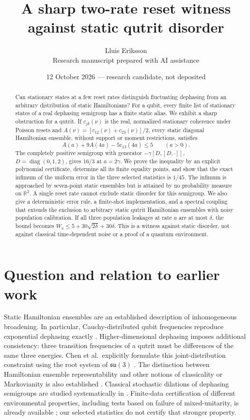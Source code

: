 \documentclass[11pt,a4paper]{article}
\title{A sharp two-rate reset witness against static qutrit disorder}
\author{Lluis Eriksson\\\small Research manuscript prepared with AI assistance}
\date{12 October 2026 --- research candidate, not deposited}
\newcommand{\R}{\mathbb R}
\newcommand{\diag}{\operatorname{diag}}
\begin{document}
\maketitle
\begin{abstract}
Can stationary states at a few reset rates distinguish fluctuating
dephasing from an arbitrary distribution of static Hamiltonians?
For a qubit, every finite list of stationary states of a real dephasing
semigroup has a finite static alias. We exhibit a sharp obstruction for
a qutrit. If $c_{jk}(\nu)$ is the real, normalized stationary coherence
under Poisson resets and $A(\nu)=[c_{12}(\nu)+c_{23}(\nu)]/2$, every
static diagonal Hamiltonian ensemble, without support or moment
restrictions, satisfies
\[
 A(a)+9A(4a)-5c_{13}(4a)\leq5\qquad(a>0).
\]
The completely positive semigroup with generator
$-\gamma[D,[D,\cdot]]$, $D=\diag(0,1,2)$, gives $16/3$ at
$a=2\gamma$. We prove the inequality by an explicit polynomial
certificate, determine all its finite equality points, and show that the
exact infimum of the uniform error in the three selected statistics is
$1/45$. The infimum is approached by seven-point static ensembles but
is attained by no probability measure on $\R^2$. A single reset rate
cannot exclude static disorder for this semigroup. We also give a
deterministic error rule, a finite-shot implementation, and a spectral
coupling that extends the exclusion to arbitrary static qutrit Hamiltonian
ensembles with noisy population calibration. If all three population
leakages at rate $a$ are at most $\delta$, the bound becomes
$W_a\leq5+30\sqrt{2\delta}+30\delta$. This is a witness against static
disorder, not against classical time-dependent noise or a proof of a
quantum environment.
\end{abstract}

\section{Question and relation to earlier work}
Static Hamiltonian ensembles are an established description of
inhomogeneous broadening. In particular, Cauchy-distributed qubit
frequencies reproduce exponential dephasing exactly
\cite{kropf,chen2018}. Higher-dimensional dephasing imposes additional
consistency: three transition frequencies of a qutrit must be
differences of the same three energies. Chen et al.\ explicitly formulate
this joint-distribution constraint using the root system of
$\mathfrak{su}(3)$ \cite{chen2019}. The distinction between Hamiltonian
ensemble representability and other notions of classicality or
Markovianity is also established \cite{chen2021}.
Classical stochastic dilations of dephasing semigroups are studied
systematically in \cite{fagnola}. Finite-data certification of different
environmental properties, including tests based on failure of
mixed-unitarity, is already available \cite{lin}; our selected statistics
do not certify that stronger property.
\end{document}

